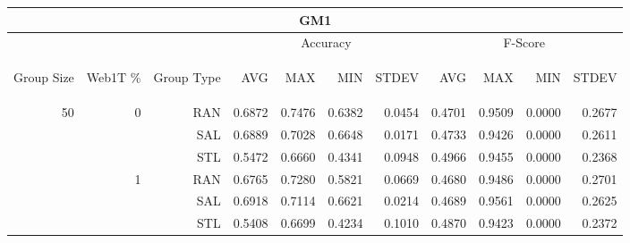\begin{center}
\begin{table}[htbp] 
 \begin{center}
\begin{tabular}{ | r | r | r | r | r | r | r | r | r | r | r |}
\hline
\multicolumn{11}{|c|}{GM1}\\
\hline
 & & & \multicolumn{4}{|c|}{Accuracy} & \multicolumn{4}{|c|}{F-Score}\\ \cline{4-11}
\begin{sideways}Group Size\end{sideways} & \begin{sideways}Web1T \%\end{sideways} & \begin{sideways}Group Type\end{sideways} & \begin{sideways}AVG\end{sideways} & \begin{sideways}MAX\end{sideways} & \begin{sideways}MIN\end{sideways} & \begin{sideways}STDEV\end{sideways} & \begin{sideways}AVG\end{sideways} & \begin{sideways}MAX\end{sideways} & \begin{sideways}MIN\end{sideways} & \begin{sideways}STDEV\end{sideways}\\
\hline
\multirow{18}{*}{50}
 & \multirow{3}{*}{0} & RAN & 0.6872 & 0.7476 & 0.6382 & 0.0454 & 0.4701 & 0.9509 & 0.0000 & 0.2677\\ \cline{3-11}
 &   & SAL & 0.6889 & 0.7028 & 0.6648 & 0.0171 & 0.4733 & 0.9426 & 0.0000 & 0.2611\\ \cline{3-11}
 &   & STL & 0.5472 & 0.6660 & 0.4341 & 0.0948 & 0.4966 & 0.9455 & 0.0000 & 0.2368\\ \cline{2-11}
 & \multirow{3}{*}{1} & RAN & 0.6765 & 0.7280 & 0.5821 & 0.0669 & 0.4680 & 0.9486 & 0.0000 & 0.2701\\ \cline{3-11}
 &   & SAL & 0.6918 & 0.7114 & 0.6621 & 0.0214 & 0.4689 & 0.9561 & 0.0000 & 0.2625\\ \cline{3-11}
 &   & STL & 0.5408 & 0.6699 & 0.4234 & 0.1010 & 0.4870 & 0.9423 & 0.0000 & 0.2372\\ \cline{2-11}

\end{tabular}
\end{center}
\end{table}
\end{center}
